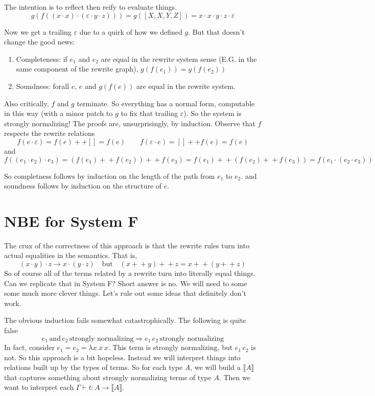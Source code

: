\documentclass[12pt]{article}
\begin{document}
The intention is to reflect then reify to evaluate things.
\[
  g(f( (x \cdot x) \cdot (\varepsilon \cdot y \cdot z))) = g ([X,X,Y,Z]) = x\cdot x \cdot y \cdot z \cdot \varepsilon
\]

Now we get a trailing $\varepsilon$ due to a quirk of how we defined $g$.
But that doesn't change the good news:
\begin{enumerate}
    \item Completeness: if $e_1$ and $e_2$ are equal in the rewrite system sense (E.G. in the same component of the rewrite graph), $g (f (e_1)) = g(f(e_2))$
    \item Soundness: forall $e$, $e$ and $g(f(e))$ are equal in the rewrite system.
\end{enumerate}
Also critically, $f$ and $g$ terminate.
So everything has a normal form, computable in this way (with a minor patch to $g$ to fix that trailing $\varepsilon$).
So the system is strongly normalizing!
The proofs are, unsurprisingly, by induction. 
Observe that $f$ respects the rewrite relations
\[
f (e\cdot \varepsilon ) = f(e) ++ [] = f(e)\quad\quad
  f (\varepsilon \cdot e ) = [] ++ f(e) = f(e)
\]
and 
\[
f ((e_1\cdot e_2) \cdot e_3) = (f(e_1) +\!+ f(e_2)) +\!+ f(e_3) = f(e_1) +\!+ (f(e_2) +\!+ f(e_3)) = f (e_1\cdot (e_2 \cdot e_3))
\]

So completness follows by induction on the length of the path from $e_1$ to $e_2$.
and soundness follows by induction on the structure of $e$.

\section{NBE for System F}
The crux of the correctness of this approach is that the rewrite rules turn into actual equalities in the semantics.
That is, 
\[
  (x\cdot y) \cdot z \rightarrow x \cdot (y \cdot z)\quad \text{but}\quad
    (x +\!+ y) +\!+ z = x +\!+ (y +\!+ z)
\]
So of course all of the terms related by a rewrite turn into literally equal things.
Can we replicate that in System F? 
Short answer is no. 
We will need to some some much more clever things.
Let's rule out some ideas that definitely don't work.

The obvious induction fails somewhat catastrophically. The following is quite false
\[
 e_1 \, \text{and}\, e_2\, \text{strongly normalizing} \Rightarrow e_1 \, e_2\, \text{strongly normalizing}
\]
In fact, consider $e_1 = e_2 = \lambda x. x \, x$. 
This term is strongly normalizing, but $e_1 \, e_2$ is not.
So this approach is a bit hopeless.
Instead we will interpret things into relations built up by the types of terms.
So for each type $A$, we will build a $\llbracket A \rrbracket$ that 
captures something about strongly normalizing terms of type $A$.
Then we want to interpret each $\Gamma \vdash t : A \rightarrow \llbracket A \rrbracket$.
\end{document}
